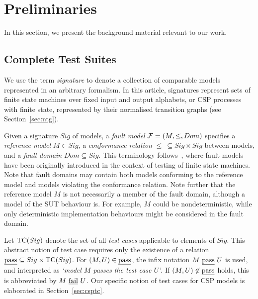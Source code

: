 \section{Preliminaries}
\label{section:preliminaries}

In this section, we present the background material relevant to our work.

\subsection{Complete Test Suites}
\label{sec:fsmfm}

We use the term \emph{signature} to denote a collection of comparable models
represented in an arbitrary formalism. In this article, signatures represent
sets of finite state machines over fixed input and output alphabets, or CSP
processes with finite state, represented by their normalised transition
graphs (see Section~\ref{sec:ntg}).

Given a signature $Sig$  of models, a  \emph{fault model} ${\cal F} =
(M,\le,Dom)$ specifies a \emph{reference model} $M\in Sig$, a
\emph{conformance relation} $\le\ \subseteq Sig\times Sig$ between models,
and a \emph{fault domain} $Dom\subseteq Sig$. This terminology
follows~\cite{gotzhein_fault_1996}, where fault models have been originally
introduced in the context of testing of finite state machines. Note that
fault domains may contain both models conforming to the reference model and
models violating the conformance relation. Note further that the reference
model $M$ is not necessarily a member of the fault domain, although a model
of the SUT behaviour is. For example, $M$ could be nondeterministic, while
only deterministic implementation behaviours might be considered in the fault
domain.

Let ${\text{TC}}(Sig)$ denote the set of all \emph{test cases} applicable to elements
of $Sig$. This abstract notion of test case requires only the existence of a
relation $\underline{\text{pass}}\subseteq Sig\times {\text{TC}}(Sig)$. For $(M,U)\in\underline{\text{pass}}$, the infix
notation $M\ \underline{\text{pass}}\ U$ is used, and interpreted as {\it `model $M$ passes the
test case $U$'}. If $(M,U)\not\in\underline{\text{pass}}$ holds, this is abbreviated by $M\
\underline{\text{fail}}\ U$. Our specific notion of test cases for CSP models is elaborated in
Section~\ref{sec:csptc}.

